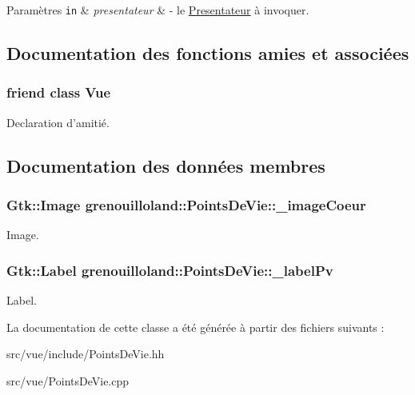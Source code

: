 \begin{DoxyParams}[1]{Paramètres}
\mbox{\tt in}  & {\em presentateur} & -\/ le \hyperlink{classgrenouilloland_1_1Presentateur}{Presentateur} à invoquer. \\
\hline
\end{DoxyParams}


\subsection{Documentation des fonctions amies et associées}
\hypertarget{classgrenouilloland_1_1PointsDeVie_adc3b1810b8d3988a7832f57c330fe4fd}{
\subsubsection[{Vue}]{\setlength{\rightskip}{0pt plus 5cm}friend class {\bf Vue}\hspace{0.3cm}{\ttfamily [friend]}}}\label{classgrenouilloland_1_1PointsDeVie_adc3b1810b8d3988a7832f57c330fe4fd}
Declaration d'amitié. 

\subsection{Documentation des données membres}
\hypertarget{classgrenouilloland_1_1PointsDeVie_a154df2e799b244ec1d0374af4297eb5d}{
\subsubsection[{\-\_\-image\-Coeur}]{\setlength{\rightskip}{0pt plus 5cm}Gtk\-::\-Image grenouilloland\-::\-Points\-De\-Vie\-::\-\_\-image\-Coeur\hspace{0.3cm}{\ttfamily [protected]}}}\label{classgrenouilloland_1_1PointsDeVie_a154df2e799b244ec1d0374af4297eb5d}
Image. \hypertarget{classgrenouilloland_1_1PointsDeVie_a6b7f96b9a6eca2629c76ef30598c7b7b}{
\subsubsection[{\-\_\-label\-Pv}]{\setlength{\rightskip}{0pt plus 5cm}Gtk\-::\-Label grenouilloland\-::\-Points\-De\-Vie\-::\-\_\-label\-Pv\hspace{0.3cm}{\ttfamily [protected]}}}\label{classgrenouilloland_1_1PointsDeVie_a6b7f96b9a6eca2629c76ef30598c7b7b}
Label. 

La documentation de cette classe a été générée à partir des fichiers suivants \-:\begin{DoxyCompactItemize}
\item 
src/vue/include/Points\-De\-Vie.\-hh\item 
src/vue/Points\-De\-Vie.\-cpp\end{DoxyCompactItemize}
